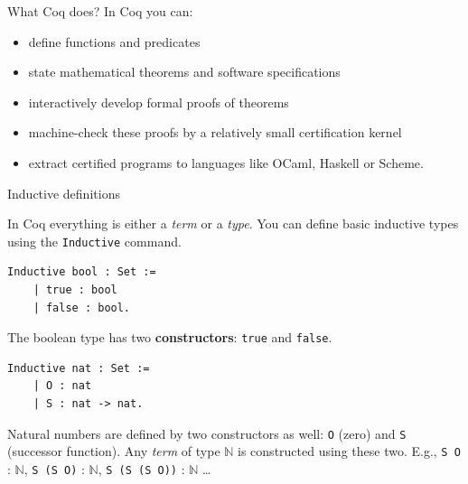 \documentclass[10pt]{beamer}
\begin{document}
\begin{frame}{What Coq does?}
  In Coq you can:
  \begin{itemize}
  
    \item define functions and predicates
   \item state mathematical theorems and software specifications
    \item interactively develop formal proofs of theorems
   \item machine-check these proofs by a relatively small certification kernel
    \item extract certified programs to languages like OCaml, Haskell or Scheme.
  \end{itemize}
  

\end{frame}


\begin{frame}[fragile]{Inductive definitions}

  In Coq everything is either a {\it term} or a {\it type}. You can define basic inductive types using the \texttt{Inductive} command.

  \begin{lstlisting}[language=Coq]
  Inductive bool : Set :=
    | true : bool
    | false : bool.

  \end{lstlisting}

  The boolean type has two {\bf constructors}: \texttt{true} and \texttt{false}.  
  
   \begin{lstlisting}[language=Coq]
  Inductive nat : Set :=
    | O : nat
    | S : nat -> nat.  
   \end{lstlisting}

   Natural numbers are defined by two constructors as well: \texttt{O} (zero) and \texttt{S} (successor function). Any {\it term} of type $\mathbb{N}$ is constructed using these two. E.g., \texttt{S O} : $\mathbb{N}$, \texttt{S (S O)} : $\mathbb{N}$, \texttt{S (S (S O))} : $\mathbb{N}$  \ldots
\end{frame}
\end{document}
